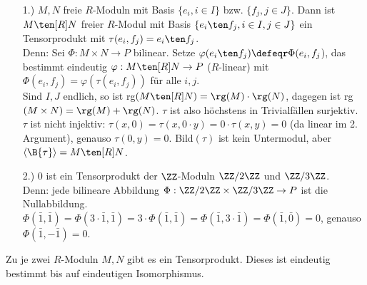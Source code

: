 \begin{nnBsp}
  \begin{enumerate}
    \item[1.)] $M, N$ freie $R$-Moduln mit Basis $\{e_i, i \in I\}$ bzw. $\{f_j, j
               \in J\}$. Dann ist $M \ten[R] N$ freier $R$-Modul mit Basis
               $\{e_i\ten f_j, i \in I, j \in J\}$ ein Tensorprodukt mit
               $\tau(e_i,f_j) = e_i\ten f_j$.\\
               Denn: Sei $\Phi: M \times N \to P$ bilinear. Setze
               $\varphi(e_i \ten f_j) \defeqr \Phi(e_i,f_j$), das bestimmt eindeutig
               $\varphi: M \ten[R] N \to P$ ($R$-linear) mit $\Phi(e_i,f_j) =
               \varphi(\tau(e_i,f_j))$ für alle $i,j$.\\
               Sind $I, J$ endlich, so ist rg$(M \ten[R] N) = \rg(M) \cdot
               \rg(N)$, dagegen ist rg$(M \times N) = \rg(M) +
               \rg(N)$. $\tau$ ist also höchstens in Trivialfällen
               surjektiv. $\tau$ ist nicht injektiv: $\tau(x,0) = \tau(x,0 \cdot
               y) = 0 \cdot \tau(x,y) = 0$ (da linear im 2. Argument), genauso
               $\tau(0,y) = 0$. Bild$(\tau)$ ist kein Untermodul, aber $\langle
               \B{\tau} \rangle = M \ten[R] N$.
    \item[2.)] $0$ ist ein Tensorprodukt der $\ZZ$-Moduln
               $\ZZ/2\ZZ$ und $\ZZ/3\ZZ$.\\
               Denn: jede bilineare Abbildung $\Phi: \ZZ/2\ZZ
               \times \ZZ/3\ZZ \to P$ ist die Nullabbildung.
               $\Phi(\bar{1},\bar{1}) = \Phi(3 \cdot \bar{1},\bar{1}) = 3 \cdot
               \Phi(\bar{1},\bar{1}) = \Phi(\bar{1},3 \cdot \bar{1}) =
               \Phi(\bar{1},\bar{0})= 0$, genauso $\Phi(\bar{1},-\bar{1}) = 0$.
  \end{enumerate}
\end{nnBsp}

\begin{Satz}
  Zu je zwei $R$-Moduln $M,N$ gibt es ein Tensorprodukt. Dieses ist eindeutig
  bestimmt bis auf eindeutigen Isomorphismus.
\end{Satz}

